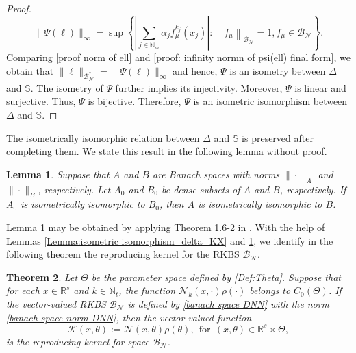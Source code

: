 \documentclass[11pt]{article}
\newtheorem{theorem}{Theorem}
\newtheorem{lemma}[theorem]{Lemma}
\begin{document}
\begin{proof}
    \begin{equation}\label{proof: infinity normn of psi(ell) final form}
       \|\Psi(\ell)\|_\infty=\sup\left\{\left|\sum_{j\in\mathbb{N}_m}\alpha_{j} f_{\mu}^{k_j}(x_j)\right|:\left\|f_\mu\right\|_{\mathcal{B}_{\mathcal{N}}}=1, f_\mu\in\mathcal{B}_{\mathcal{N}}\right\}. 
    \end{equation}
    Comparing \eqref{proof norm of ell} and \eqref{proof: infinity normn of psi(ell) final form}, we obtain that 
    $   \|\ell\|_{\mathcal{B}_{\mathcal{N}}^*}=\|\Psi(\ell)\|_\infty$ and hence, $\Psi$ is an isometry between $\Delta$ and $\mathbb{S}$. The isometry of $\Psi$ further implies its injectivity.  Moreover, $\Psi$ is linear and surjective. Thus, $\Psi$ is  bijective. Therefore, $\Psi$ is an isometric isomorphism between $\Delta$ and $\mathbb{S}$. 
\end{proof}

The isometrically isomorphic relation between $\Delta$ and $\mathbb{S}$ is preserved after completing them. We state this result in the following lemma without proof.

\begin{lemma}\label{isometric-isomorphism-after-completion}
    Suppose that $A$ and $B$ are Banach spaces with norms $\|\cdot\|_A$ and $\|\cdot\|_B$, respectively. Let $A_0$ and $B_0$ be dense subsets of $A$ and $B$, respectively. If $A_0$ is isometrically isomorphic to $B_0$, then $A$ is isometrically isomorphic to $B$.
\end{lemma}

Lemma \ref{isometric-isomorphism-after-completion} may be obtained by applying Theorem 1.6-2 in \cite{kreyszig1991introductory}.
With the help of Lemmas \ref{Lemma:isometric isomorphism_delta_KX} and \ref{isometric-isomorphism-after-completion}, we identify in the following theorem the reproducing kernel for the RKBS $\mathcal{B}_{\mathcal{N}}$.

\begin{theorem}\label{theorem: Kernel of BN}
Let $\Theta$ be the parameter space defined by \eqref{Def:Theta}. Suppose that  
for each $x\in \mathbb{R}^s$ and $k\in\mathbb{N}_t$, the function $\mathcal{N}_k({x},\cdot)\rho(\cdot)$ belongs to $C_0(\Theta)$. If the vector-valued RKBS $\mathcal{B}_{\mathcal{N}}$ is defined by \eqref{banach space DNN} with the norm \eqref{banach space norm DNN}, then the vector-valued function 
\begin{equation}\label{Kernel}
\mathcal{K}(x,\theta):=\mathcal{N}(x,\theta)\rho(\theta), \ \ \mbox{for}\ \ (x,\theta)\in \mathbb{R}^s\times\Theta,
\end{equation}
is the reproducing kernel for space $\mathcal{B}_{\mathcal{N}}$.
\end{theorem}
\end{document}
